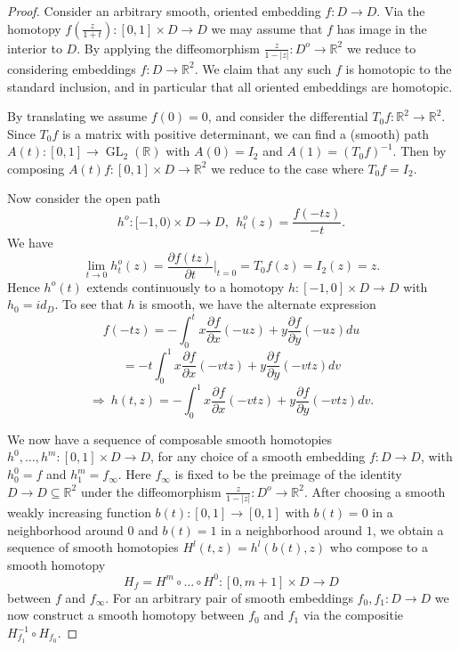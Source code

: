 \documentclass[reqno]{amsart}
\theoremstyle{definition}
\newcommand{\mbb}[1]{\mathbb{#1}}
\newcommand{\opn}[1]{\operatorname{#1}}
\renewcommand{\1}{\mathbf{1}}
\begin{document}
\begin{proof}
Consider an arbitrary smooth, oriented embedding $f:D\to D$.  Via the homotopy $f(\frac{z}{1+t}):[0,1]\times D\to D$ we may assume that $f$ has image in the interior to $D$. By applying the diffeomorphism $\frac{z}{1-|z|}:D^o\to \mbb{R}^2$ we reduce to considering embeddings $f:D\to \mbb{R}^2$.  We claim that any such $f$ is homotopic to the standard inclusion, and in particular that all oriented embeddings are homotopic.
\par

By translating we assume $f(0)=0$, and consider the differential $T_0f:\mbb{R}^2\to \mbb{R}^2$.  Since $T_0f$ is a matrix with positive determinant, we can find a (smooth) path $A(t):[0,1]\to \opn{GL}_2(\mbb{R})$ with $A(0)=I_2$ and $A(1)=(T_0f)^{-1}$.  Then by composing $A(t)f:[0,1]\times D\to \mbb{R}^2$ we reduce to the case where $T_0f=I_2$.
\par

Now consider the open path
\[
h^o:[-1,0)\times D\to D,\ \ h^o_t(z)=\frac{f(-tz)}{-t}.
\]
We have
\[
\lim_{t\to 0} h^o_t(z)=\frac{\partial f(tz)}{\partial t}|_{t=0}=T_0f(z)=I_2(z)=z.
\]
Hence $h^o(t)$ extends continuously to a homotopy $h:[-1,0]\times D\to D$ with $h_0=id_D$.  To see that $h$ is smooth, we have the alternate expression
\[
f(-tz)=-\int_0^tx\frac{\partial f}{\partial x}(-uz)+y\frac{\partial f}{\partial y}(-uz)du
\]
\[
=-t\int^1_0x\frac{\partial f}{\partial x}(-vtz)+y\frac{\partial f}{\partial y}(-vtz)dv
\]
\[
\Rightarrow\ h(t,z)=-\int_0^1x\frac{\partial f}{\partial x}(-vtz)+y\frac{\partial f}{\partial y}(-vtz)dv.
\]

We now have a sequence of composable smooth homotopies $h^0,\dots,h^m:[0,1]\times D\to D$, for any choice of a smooth embedding $f:D\to D$, with $h^0_0=f$ and $h^m_1=f_{\infty}$.  Here $f_{\infty}$ is fixed to be the preimage of the identity $D\to D\subseteq \mbb{R}^2$ under the diffeomorphism $\frac{z}{1-|z|}:D^o\to \mbb{R}^2$.  After choosing a smooth weakly increasing function $b(t):[0,1]\to [0,1]$ with $b(t)=0$ in a neighborhood around $0$ and $b(t)=1$ in a neighborhood around $1$, we obtain a sequence of smooth homotopies $H^l(t,z)=h^l(b(t),z)$ who compose to a smooth homotopy
\[
H_{f}=H^m\circ\dots\circ H^0:[0,m+1]\times D\to D
\]
between $f$ and $f_{\infty}$.  For an arbitrary pair of smooth embeddings $f_0,f_1:D\to D$ we now construct a smooth homotopy between $f_0$ and $f_1$ via the compositie $H_{f_1}^{-1}\circ H_{f_0}$.
\end{proof}
\end{document}
